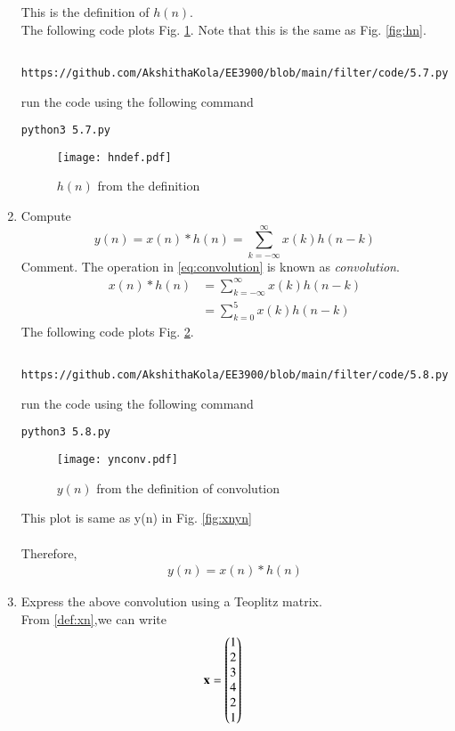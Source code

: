 \documentclass[journal,12pt,twocolumn]{IEEEtran}
\renewcommand\thesection{\arabic{section}}
\begin{document}
\begin{enumerate}[label=\thesection.\arabic*]
%
This is the definition of $h(n)$.
\\
\solution The following code plots Fig. \ref{fig:hndef}. Note that this is the same as Fig. \ref{fig:hn}. 
%
\begin{lstlisting}
	https://github.com/AkshithaKola/EE3900/blob/main/filter/code/5.7.py
\end{lstlisting}
run the code using the following command
\begin{lstlisting}
python3 5.7.py
\end{lstlisting}
\begin{figure}[!ht]
\centering
\texttt{[image: hndef.pdf]}
\caption{$h(n)$ from the definition}
\label{fig:hndef}
\end{figure}
\item Compute 
%
\begin{equation}
\label{eq:convolution}
y(n) = x(n)*h(n) = \sum_{k=-\infty}^{\infty}x(k)h(n-k)
\end{equation}
%
Comment. The operation in \eqref{eq:convolution} is known as
{\em convolution}.
%
\\
\solution 
\begin{align}
x(n)*h(n) &= \sum_{k=-\infty}^{\infty}x(k)h(n-k)\\ &= \sum_{k=0}^{5}x(k)h(n-k)
\end{align}
The following code plots Fig. \ref{fig:ynconv}.
%
\begin{lstlisting}
	https://github.com/AkshithaKola/EE3900/blob/main/filter/code/5.8.py
\end{lstlisting}
run the code using the following command
\begin{lstlisting}
python3 5.8.py
\end{lstlisting}
\begin{figure}[!htbp]
\centering
\texttt{[image: ynconv.pdf]}
\caption{$y(n)$ from the definition of convolution}
\label{fig:ynconv}
\end{figure}
This plot is same as y(n) in Fig. \ref{fig:xnyn}\\\\
Therefore,
\begin{align}
y(n) = x(n) * h(n)
\end{align}
\item Express the above convolution using a Teoplitz matrix.\\
\solution From \eqref{def:xn},we can write
\begin{align}
\vec{x} = \myvec{1 \\ 2 \\ 3 \\ 4 \\ 2 \\ 1} \qquad

\end{align}
\end{enumerate}
\end{document}

